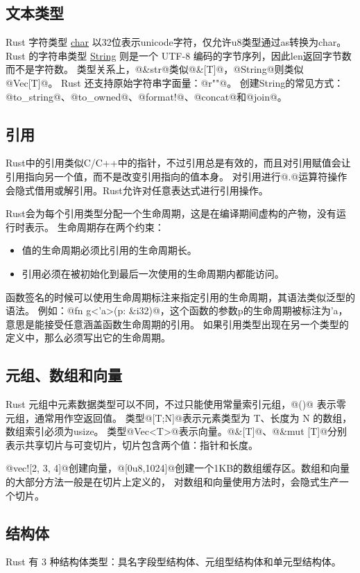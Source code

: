 \subsection{文本类型}
Rust 字符类型 \href{https://doc.rust-lang.org/std/primitive.char.html}{char} 以32位表示unicode字符，仅允许u8类型通过as转换为char。
Rust 的字符串类型 \href{https://doc.rust-lang.org/std/string/struct.String.html}{String} 则是一个 UTF-8 编码的字节序列，因此len返回字节数而不是字符数。
类型关系上，@&str@类似@&[T]@，@String@则类似@Vec[T]@。
Rust 还支持原始字符串字面量：@r""@。
创建String的常见方式：@to_string@、@to_owned@、@format!@、@concat@和@join@。

\subsection{引用}
Rust中的引用类似C/C++中的指针，不过引用总是有效的，而且对引用赋值会让引用指向另一个值，而不是改变引用指向的值本身。
对引用进行@.@运算符操作会隐式借用或解引用。Rust允许对任意表达式进行引用操作。

Rust会为每个引用类型分配一个生命周期，这是在编译期间虚构的产物，没有运行时表示。
生命周期存在两个约束：
\begin{itemize}[itemsep=0pt, parsep=0pt]
	\item 值的生命周期必须比引用的生命周期长。
	\item 引用必须在被初始化到最后一次使用的生命周期内都能访问。
\end{itemize}

函数签名的时候可以使用生命周期标注来指定引用的生命周期，其语法类似泛型的语法。
例如：@fn g<'a>(p: &i32)@，这个函数的参数p的生命周期被标注为'a，意思是能接受任意涵盖函数生命周期的引用。
如果引用类型出现在另一个类型的定义中，那么必须写出它的生命周期。

\subsection{元组、数组和向量}
Rust 元组中元素数据类型可以不同，不过只能使用常量索引元组，@()@ 表示零元组，通常用作空返回值。
类型@[T;N]@表示元素类型为 T、长度为 N 的数组，数组索引必须为usize。
类型@Vec<T>@表示向量。@&[T]@、@&mut [T]@分别表示共享切片与可变切片，切片包含两个值：指针和长度。

@vec![2, 3, 4]@创建向量，@[0u8,1024]@创建一个1KB的数组缓存区。数组和向量的大部分方法一般是在切片上定义的，
对数组和向量使用方法时，会隐式生产一个切片。

\subsection{结构体}
Rust 有 3 种结构体类型：具名字段型结构体、元组型结构体和单元型结构体。


